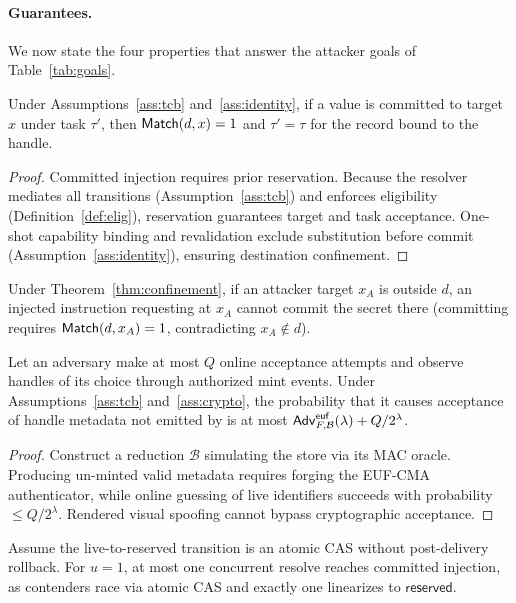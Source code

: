 \paragraph{Guarantees.} We now state the four properties that answer the attacker goals of Table~\ref{tab:goals}.

\begin{theorem}
\label{thm:confinement}
Under Assumptions~\ref{ass:tcb} and~\ref{ass:identity}, if a \SH{} value is committed to target $x$ under task $\tau'$, then $\mathsf{Match}(d,x)=1$ and $\tau'=\tau$ for the record bound to the handle.
\end{theorem}
\begin{proof}
Committed injection requires prior reservation. Because the resolver mediates all transitions (Assumption~\ref{ass:tcb}) and enforces eligibility (Definition~\ref{def:elig}), reservation guarantees target and task acceptance. One-shot capability binding and revalidation exclude substitution before commit (Assumption~\ref{ass:identity}), ensuring destination confinement.
\end{proof}

\begin{corollary}
\label{cor:redirection}
Under Theorem~\ref{thm:confinement}, if an attacker target $x_A$ is outside $d$, an injected instruction requesting \Enter{} at $x_A$ cannot commit the secret there (committing requires $\mathsf{Match}(d,x_A)=1$, contradicting $x_A\notin d$).
\end{corollary}

\begin{theorem}
\label{thm:unforgeability}
Let an adversary make at most $Q$ online acceptance attempts and observe handles of its choice through authorized mint events. Under Assumptions~\ref{ass:tcb} and~\ref{ass:crypto}, the probability that it causes acceptance of handle metadata not emitted by \Mint{} is at most $\mathsf{Adv}^{\mathsf{euf}}_{F,\mathcal{B}}(\lambda)+Q/2^\lambda$.
\end{theorem}
\begin{proof}
Construct a reduction $\mathcal{B}$ simulating the store via its MAC oracle. Producing un-minted valid metadata requires forging the EUF-CMA authenticator, while online guessing of live identifiers succeeds with probability $\le Q/2^\lambda$. Rendered visual spoofing cannot bypass cryptographic acceptance.
\end{proof}

\begin{proposition}
\label{prop:singleuse}
Assume the live-to-reserved transition is an atomic CAS without post-delivery rollback. For $u=1$, at most one concurrent resolve reaches committed injection, as contenders race via atomic CAS and exactly one linearizes to $\mathsf{reserved}$.
\end{proposition}

